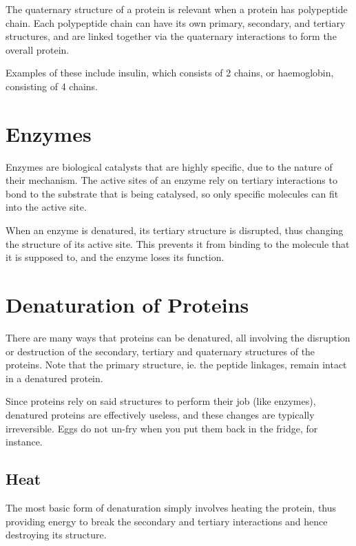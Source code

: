 			The quaternary structure of a protein is relevant when a protein has  polypeptide chain. Each polypeptide chain
			can have its own primary, secondary, and tertiary structures, and are linked together via the quaternary interactions to form the
			overall protein.

			Examples of these include insulin, which consists of 2 chains, or haemoglobin, consisting of 4 chains.





	\section{Enzymes}

		Enzymes are biological catalysts that are highly specific, due to the nature of their mechanism. The active sites of an enzyme rely on
		tertiary interactions to bond to the substrate that is being catalysed, so only specific molecules can fit into the active site.

		When an enzyme is denatured, its tertiary structure is disrupted, thus changing the structure of its active site. This prevents it
		from binding to the molecule that it is supposed to, and the enzyme loses its function.




	\section{Denaturation of Proteins}

		There are many ways that proteins can be denatured, all involving the disruption or destruction of the secondary, tertiary and quaternary
		structures of the proteins. Note that the primary structure, ie. the peptide linkages, remain intact in a denatured protein.

		Since proteins rely on said structures to perform their job (like enzymes), denatured proteins are effectively useless, and these
		changes are typically irreversible. Eggs do not un-fry when you put them back in the fridge, for instance.


		\subsection{Heat}

			The most basic form of denaturation simply involves heating the protein, thus providing energy to break the secondary and tertiary
			interactions and hence destroying its structure.

